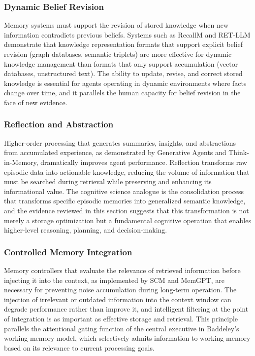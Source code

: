 \subsubsection{Dynamic Belief Revision}

Memory systems must support the revision of stored knowledge when new information contradicts previous beliefs. Systems such as RecallM and RET-LLM demonstrate that knowledge representation formats that support explicit belief revision (graph databases, semantic triplets) are more effective for dynamic knowledge management than formats that only support accumulation (vector databases, unstructured text). The ability to update, revise, and correct stored knowledge is essential for agents operating in dynamic environments where facts change over time, and it parallels the human capacity for belief revision in the face of new evidence.

\subsubsection{Reflection and Abstraction}

Higher-order processing that generates summaries, insights, and abstractions from accumulated experience, as demonstrated by Generative Agents and Think-in-Memory, dramatically improves agent performance. Reflection transforms raw episodic data into actionable knowledge, reducing the volume of information that must be searched during retrieval while preserving and enhancing its informational value. The cognitive science analogue is the consolidation process that transforms specific episodic memories into generalized semantic knowledge, and the evidence reviewed in this section suggests that this transformation is not merely a storage optimization but a fundamental cognitive operation that enables higher-level reasoning, planning, and decision-making.

\subsubsection{Controlled Memory Integration}

Memory controllers that evaluate the relevance of retrieved information before injecting it into the context, as implemented by SCM and MemGPT, are necessary for preventing noise accumulation during long-term operation. The injection of irrelevant or outdated information into the context window can degrade performance rather than improve it, and intelligent filtering at the point of integration is as important as effective storage and retrieval. This principle parallels the attentional gating function of the central executive in Baddeley's working memory model, which selectively admits information to working memory based on its relevance to current processing goals.

